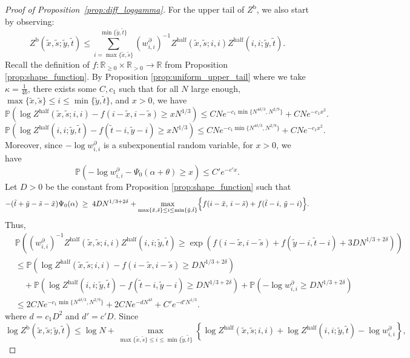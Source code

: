 \documentclass[11pt]{article}
\theoremstyle{definition}
\newcommand{\R}{\mathbb{R}}
\newcommand{\Prob}{\mathbb{P}}
\newcommand{\Zhalf}{Z^{\mathrm{half}}}
\newcommand{\Zb}{Z^{\mathrm{b}}}
\begin{document}
\begin{proof}[Proof of Proposition~\ref{prop:diff_loggamma}]
For the upper tail of $\Zb$, we also start by observing:
\[
\Zb(\tilde{x}, \tilde{s};\tilde{y}, \tilde{t}) \leq  \sum_{i = \max\{\tilde{x}, \tilde{s}\}}^{ \min\{\tilde{y}, \tilde{t}\}} (w^{\partial}_{i,i})^{-1} \Zhalf(\tilde{x}, \tilde{s};i,i)\Zhalf(i,i;\tilde{y},\tilde{t}).
\]
Recall the definition of $f:\mathbb R_{\geq 0} \times \R_{>0}\to\mathbb R$ from Proposition \ref{prop:shape_function}. By Proposition \ref{prop:uniform_upper_tail} where we take $\kappa = \frac{1}{4b}$, there exists some $C,c_1$ such that for all $N$ large enough, $\max\{\tilde{x}, \tilde{s}\}\leq i \leq \min\{\tilde{y}, \tilde{t}\}$, and $x > 0$, we have
\[
\Prob\left(\log Z^{\mathrm{half}}(\tilde{x}, \tilde{s};i,i) - f(i-\tilde{x},i - \tilde{s}) \geq xN^{1/3}\right) \leq CNe^{-c_1 \min \{N^{4\delta/3}, N^{2/9}\}} + CNe^{-c_1x^2}.
\]
\[
\Prob\left(\log Z^{\mathrm{half}}(i,i;\tilde{y}, \tilde{t}) - f(\tilde{t}-i, \tilde{y}-i) \geq xN^{1/3}\right) \leq CNe^{-c_1 \min \{N^{4\delta/3}, N^{2/9}\}} + CNe^{-c_1x^2}.
\]
Moreover, since $-\log w_{i,i}^{\partial}$ is a subexponential random variable, for $x > 0$, we have
\[
\Prob \left(-\log w_{i,i}^{\partial} -\Psi_0(\alpha + \theta) \geq x \right) \leq C'e^{-c'x}.
\]
Let $D > 0$ be the constant from Proposition \ref{prop:shape_function} such that 
\begin{equation}
-(\tilde t + \tilde{y}-\tilde s - \tilde{x})\Psi_0(\alpha)
\;\ge\;
4D N^{1/3+2\delta}
+\max_{\max\{\tilde{x}, \tilde{s}\}\leq i \leq \min\{\tilde{y}, \tilde{t}\}}
\Bigl\{
f(i-\tilde x,\, i-\tilde s)
+
f(\tilde t-i,\, \tilde y-i)
\Bigr\}.
\end{equation}
Thus,
\[
\begin{aligned}
&\Prob \left(({w_{i,i}^\partial})^{-1}\Zhalf(\tilde{x},\tilde{s};i,i)\Zhalf(i,i;\tilde{y},\tilde{t}) \geq \exp\left( f(i-\tilde{x}, i-\tilde{s})+ f(\tilde{y}- i, \tilde{t}-i) + 3DN^{1/3+2\delta}\right) \right)\\
&\leq \Prob \left(\log Z^{\mathrm{half}}(\tilde{x}, \tilde{s};i,i) - f(i-\tilde{x},i - \tilde{s}) \geq DN^{1/3 + 2\delta} \right)\\
& \quad + \Prob \left(\log Z^{\mathrm{half}}(i,i;\tilde{y}, \tilde{t}) - f(\tilde{t}-i, \tilde{y}-i) \geq DN^{1/3+2\delta}\right) + \Prob\left(-\log w_{i,i}^\partial \geq DN^{1/3+2\delta}\right)\\
&\leq 2CNe^{-c_1 \min \{N^{4\delta/3}, N^{2/9}\}} + 2CNe^{-dN^{4\delta}} + C'e^{-d'N^{1/3}}.
\end{aligned}
\]
where $d = c_1D^2$ and $d' = c'D$. Since
\[
\log \Zb(\tilde{x}, \tilde{s};\tilde{y}, \tilde{t}) \leq \log N + \max_{\max\{\tilde{x}, \tilde{s}\}\leq i \leq \min\{\tilde{y}, \tilde{t}\}} \left\{ \log \Zhalf(\tilde{x},\tilde{s};i,i) + \log \Zhalf(i, i;\tilde{y}, \tilde{t}) -\log w_{i,i}^\partial \right\},
\]
\end{proof}
\end{document}
